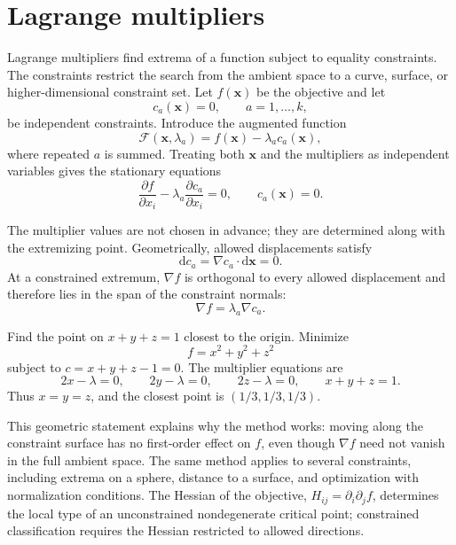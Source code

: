 \section{Lagrange multipliers}

Lagrange multipliers find extrema of a function subject to equality constraints. The constraints restrict the search from the ambient space to a curve, surface, or higher-dimensional constraint set. Let $f(\mathbf{x})$ be the objective and let
\begin{equation}
c_a(\mathbf{x})=0,
\qquad a=1,\ldots,k,
\end{equation}
be independent constraints. Introduce the augmented function
\begin{equation}
\mathcal F(\mathbf{x},\lambda_a)=f(\mathbf{x})-\lambda_a c_a(\mathbf{x}),
\end{equation}
where repeated $a$ is summed. Treating both $\mathbf{x}$ and the multipliers as independent variables gives the stationary equations
\begin{equation}
\frac{\partial f}{\partial x_i}
-\lambda_a\frac{\partial c_a}{\partial x_i}=0,
\qquad
c_a(\mathbf{x})=0.
\end{equation}

The multiplier values are not chosen in advance; they are determined along with the extremizing point. Geometrically, allowed displacements satisfy
\begin{equation}
\mathrm{d}c_a=\nabla c_a\cdot\mathrm{d}\mathbf{x}=0.
\end{equation}
At a constrained extremum, $\nabla f$ is orthogonal to every allowed displacement and therefore lies in the span of the constraint normals:
\begin{equation}
\nabla f=\lambda_a\nabla c_a.
\end{equation}

\begin{example}
Find the point on $x+y+z=1$ closest to the origin. Minimize
\begin{equation}
f=x^2+y^2+z^2
\end{equation}
subject to $c=x+y+z-1=0$. The multiplier equations are
\begin{equation}
2x-\lambda=0,
\qquad 2y-\lambda=0,
\qquad 2z-\lambda=0,
\qquad x+y+z=1.
\end{equation}
Thus $x=y=z$, and the closest point is $(1/3,1/3,1/3)$.
\end{example}

This geometric statement explains why the method works: moving along the constraint surface has no first-order effect on $f$, even though $\nabla f$ need not vanish in the full ambient space. The same method applies to several constraints, including extrema on a sphere, distance to a surface, and optimization with normalization conditions. The Hessian of the objective, $H_{ij}=\partial_i\partial_jf$, determines the local type of an unconstrained nondegenerate critical point; constrained classification requires the Hessian restricted to allowed directions.